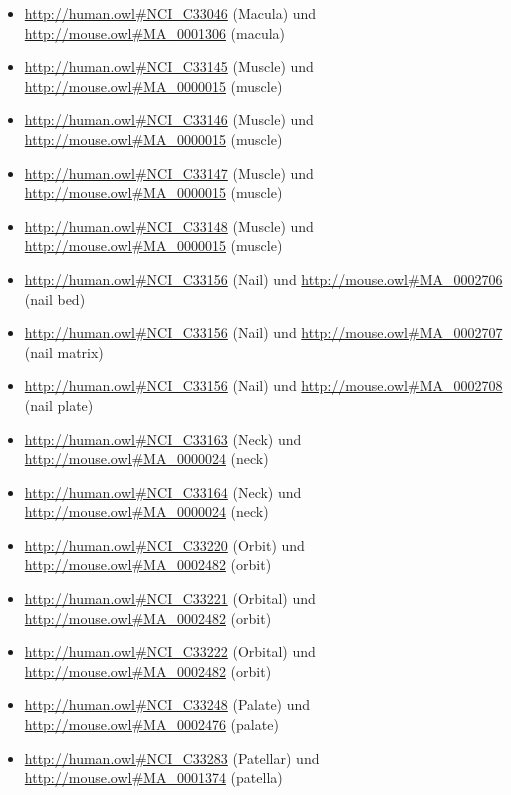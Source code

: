 \begin{itemize}
	\item \url{http://human.owl#NCI_C33046} (Macula\textunderscoreof\textunderscoreUtricle) und \url{http://mouse.owl#MA_0001306} (macula)
	\item \url{http://human.owl#NCI_C33145} (Muscle\textunderscoreund\textunderscoreFasciae\textunderscoreof\textunderscorethe\textunderscoreThorax) und \url{http://mouse.owl#MA_0000015} (muscle)
	\item \url{http://human.owl#NCI_C33146} (Muscle\textunderscoreof\textunderscorethe\textunderscoreCoccyx) und \url{http://mouse.owl#MA_0000015} (muscle)
	\item \url{http://human.owl#NCI_C33147} (Muscle\textunderscoreof\textunderscorethe\textunderscoreMastication) und \url{http://mouse.owl#MA_0000015} (muscle)
	\item \url{http://human.owl#NCI_C33148} (Muscle\textunderscoreof\textunderscorethe\textunderscoreTympanum) und \url{http://mouse.owl#MA_0000015} (muscle)
	\item \url{http://human.owl#NCI_C33156} (Nail) und \url{http://mouse.owl#MA_0002706} (nail bed)
	\item \url{http://human.owl#NCI_C33156} (Nail) und \url{http://mouse.owl#MA_0002707} (nail matrix)
	\item \url{http://human.owl#NCI_C33156} (Nail) und \url{http://mouse.owl#MA_0002708} (nail plate)
	\item \url{http://human.owl#NCI_C33163} (Neck\textunderscoreMuscle) und \url{http://mouse.owl#MA_0000024} (neck)
	\item \url{http://human.owl#NCI_C33164} (Neck\textunderscoreof\textunderscorethe\textunderscoreHumerus) und \url{http://mouse.owl#MA_0000024} (neck)
	\item \url{http://human.owl#NCI_C33220} (Orbit\textunderscoreDisc) und \url{http://mouse.owl#MA_0002482} (orbit)
	\item \url{http://human.owl#NCI_C33221} (Orbital\textunderscorePart\textunderscoreof\textunderscorethe\textunderscoreInferior\textunderscoreFrontal\textunderscoreGyrus) und \url{http://mouse.owl#MA_0002482} (orbit)
	\item \url{http://human.owl#NCI_C33222} (Orbital\textunderscoreSulcus) und \url{http://mouse.owl#MA_0002482} (orbit)
	\item \url{http://human.owl#NCI_C33248} (Palate\textunderscoreBone) und \url{http://mouse.owl#MA_0002476} (palate)
	\item \url{http://human.owl#NCI_C33283} (Patellar\textunderscoreLigament) und \url{http://mouse.owl#MA_0001374} (patella)

\end{itemize}
